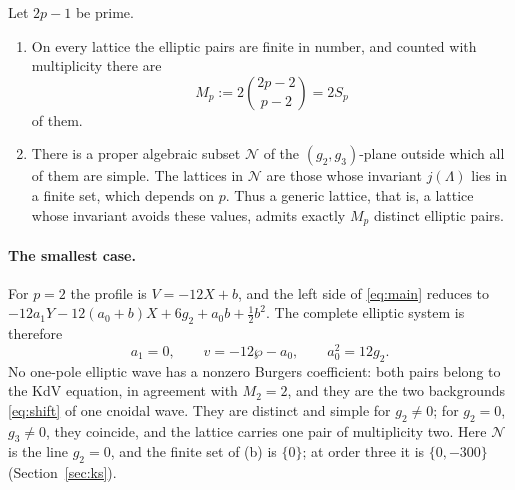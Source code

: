 \begin{theorem}\label{thm:elliptic-count}
Let \(2p-1\) be prime.
\begin{enumerate}
\item[\textup{(a)}] On every lattice the elliptic pairs are finite in
number, and counted with multiplicity there are
\begin{equation}\label{eq:elliptic-length}
 M_p:=2\binom{2p-2}{p-2}=2S_p
\end{equation}
of them.
\item[\textup{(b)}] There is a proper algebraic subset \(\mathcal N\) of
the \((g_2,g_3)\)-plane outside which all of them are simple. The
lattices in \(\mathcal N\) are those whose invariant \(j(\Lambda)\) lies
in a finite set, which depends on \(p\). Thus a generic lattice, that
is, a lattice whose invariant avoids these values, admits exactly
\(M_p\) distinct elliptic pairs.
\end{enumerate}
\end{theorem}

\paragraph{The smallest case.}
For \(p=2\) the profile is \(V=-12X+b\), and the left side of
\eqref{eq:main} reduces to \(-12a_1Y-12(a_0+b)X+6g_2+a_0b+\frac12b^2\).
The complete elliptic system is therefore
\begin{equation}\label{eq:kdvb-elliptic}
 a_1=0,\qquad v=-12\wp-a_0,\qquad a_0^2=12g_2.
\end{equation}
No one-pole elliptic wave has a nonzero Burgers coefficient: both pairs
belong to the KdV equation, in agreement with \(M_2=2\), and they are
the two backgrounds \eqref{eq:shift} of one cnoidal wave. They are
distinct and simple for \(g_2\ne0\); for \(g_2=0\), \(g_3\ne0\), they
coincide, and the lattice carries one pair of multiplicity two. Here
\(\mathcal N\) is the line \(g_2=0\), and the finite set of (b) is
\(\{0\}\); at order three it is \(\{0,-300\}\) (Section~\ref{sec:ks}).

